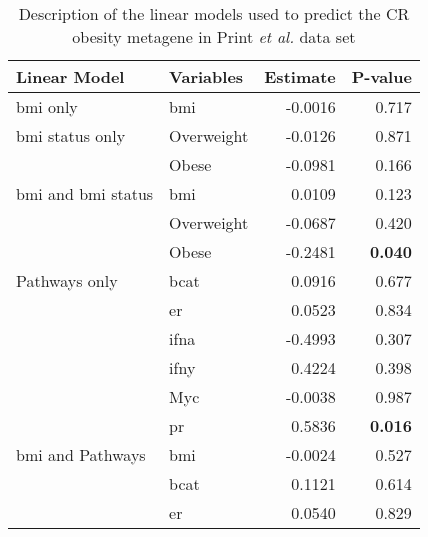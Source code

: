 \begin{table}[htpb]
	\centering
	\caption{Description of the linear models used to predict the CR obesity metagene in Print \textit{et al.} data set}
	\label{tab:lm_sig_var}
	\begin{threeparttable}
		\begin{tabular}{llrr}
			Linear Model & Variables & Estimate & P-value\\
			\hline
			\hline
			\rule{0pt}{2.25ex}\gls{bmi} only                           & \gls{bmi}  & -0.0016 & 0.717\\
			\hline
			\rule{0pt}{2.25ex}\gls{bmi} status only                    & Overweight & -0.0126 & 0.871\\
                                                                       & Obese      & -0.0981 & 0.166\\
			\hline
			\rule{0pt}{2.25ex}\gls{bmi} and \gls{bmi} status           & \gls{bmi}  & 0.0109  & 0.123\\
                                                                       & Overweight & -0.0687 & 0.420\\
                                                                       & Obese      & -0.2481 & \textbf{0.040}\tnote{1}\\
			\hline
			\rule{0pt}{2.25ex}Pathways only                            & \gls{bcat} & 0.0916  & 0.677\\
                                                                       & \gls{er}   & 0.0523  & 0.834\\
                                                                       & \gls{ifna} & -0.4993 & 0.307\\
                                                                       & \gls{ifny} & 0.4224  & 0.398\\
                                                                       & Myc        & -0.0038 & 0.987\\
                                                                       & \gls{pr}   & 0.5836  & \textbf{0.016}\\
			\hline
			\rule{0pt}{2.25ex}\gls{bmi} and Pathways                   & \gls{bmi}  & -0.0024 & 0.527\\
                                                                       & \gls{bcat} & 0.1121  & 0.614\\
                                                                       & \gls{er}   & 0.0540  & 0.829\\

\end{tabular}
\end{threeparttable}
\end{table}
